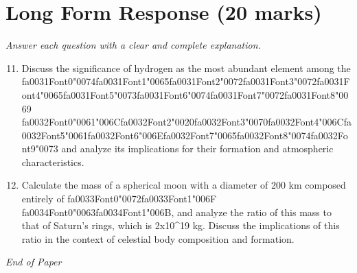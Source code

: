 \documentclass[12pt]{article}
\begin{document}
\section*{Long Form Response (20 marks)}
\textit{Answer each question with a clear and complete explanation.}
\begin{enumerate}[label=\arabic*.]
\setcounter{enumi}{10}
\item Discuss the significance of hydrogen as the most abundant element among the {\csname fa0031Font0\endcsname\char"0074}{\csname fa0031Font1\endcsname\char"0065}{\csname fa0031Font2\endcsname\char"0072}{\csname fa0031Font3\endcsname\char"0072}{\csname fa0031Font4\endcsname\char"0065}{\csname fa0031Font5\endcsname\char"0073}{\csname fa0031Font6\endcsname\char"0074}{\csname fa0031Font7\endcsname\char"0072}{\csname fa0031Font8\endcsname\char"0069} {\csname fa0032Font0\endcsname\char"0061}{\char"006C}{\csname fa0032Font2\endcsname\char"0020}{\csname fa0032Font3\endcsname\char"0070}{\csname fa0032Font4\endcsname\char"006C}{\csname fa0032Font5\endcsname\char"0061}{\csname fa0032Font6\endcsname\char"006E}{\csname fa0032Font7\endcsname\char"0065}{\csname fa0032Font8\endcsname\char"0074}{\csname fa0032Font9\endcsname\char"0073}
and analyze its implications for their formation and atmospheric characteristics.
\item Calculate the mass of a spherical moon with a diameter of 200 km composed entirely of
{\csname fa0033Font0\endcsname\char"0072}{\csname fa0033Font1\endcsname\char"006F} {\csname fa0034Font0\endcsname\char"0063}{\csname fa0034Font1\endcsname\char"006B}, and analyze the ratio of this mass to that of Saturn's rings, which is 2x10\^{}19
kg. Discuss the implications of this ratio in the context of celestial body composition
and formation.
\end{enumerate}

\vfill
\noindent\textit{End of Paper}
\end{document}
